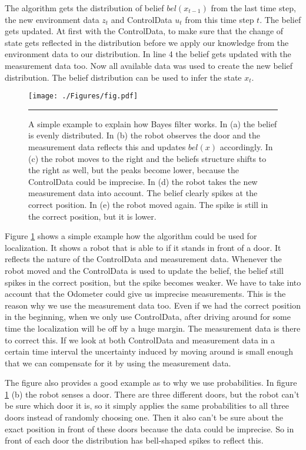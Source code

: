 The algorithm gets the distribution of belief $bel(x_{t-1})$ from the last time step, the new environment data $z_t$ and \gls{ControlData} $u_t$ from this time step $t$. The belief gets updated. At first with the \gls{ControlData}, to make sure that the change of state gets reflected in the distribution before we apply our knowledge from the environment data to our distribution. In line 4 the belief gets updated with the measurement data too. Now all available data was used to create the new belief distribution. The belief distribution can be used to infer the state $x_t$. 

\begin{figure}[htbp]
	\centering
		\texttt{[image: ./Figures/fig.pdf]}
		\rule{35em}{0.5pt}
	\caption[Localization Example]{A simple example to explain how Bayes filter works. In (a) the belief is evenly distributed. In (b) the robot observes the door and the measurement data reflects this and updates $bel(x)$ accordingly. In (c) the robot moves to the right and the beliefs structure shifts to the right as well, but the peaks become lower, because the \gls{ControlData} could be imprecise. In (d) the robot takes the new measurement data into account. The belief clearly spikes at the correct position. In (e) the robot moved again. The spike is still in the correct position, but it is lower\citep[p. 6]{Thrun:2005:PR:1121596}.}
	\label{fig:loc_example}
\end{figure}

Figure \ref{fig:loc_example} shows a simple example how the algorithm could be used for localization. It shows a robot that is able to if it stands in front of a door. It reflects the nature of the \gls{ControlData} and measurement data. Whenever the robot moved and the \gls{ControlData} is used to update the belief, the belief still spikes in the correct position, but the spike becomes weaker. We have to take into account that the \gls{Odometer} could give us imprecise measurements. This is the reason why we use the measurement data too. Even if we had the correct position in the beginning, when we only use \gls{ControlData}, after driving around for some time the localization will be off by a huge margin. The measurement data is there to correct this. If we look at both \gls{ControlData} and measurement data in a certain time interval the uncertainty induced by moving around is small enough that we can compensate for it by using the measurement data. 

The figure also provides a good example as to why we use probabilities. In figure \ref{fig:loc_example} (b) the robot senses a door. There are three different doors, but the robot can't be sure which door it is, so it simply applies the same probabilities to all three doors instead of randomly choosing one. Then it also can't be sure about the exact position in front of these doors because the data could be imprecise. So in front of each door the distribution has bell-shaped spikes to reflect this. 

